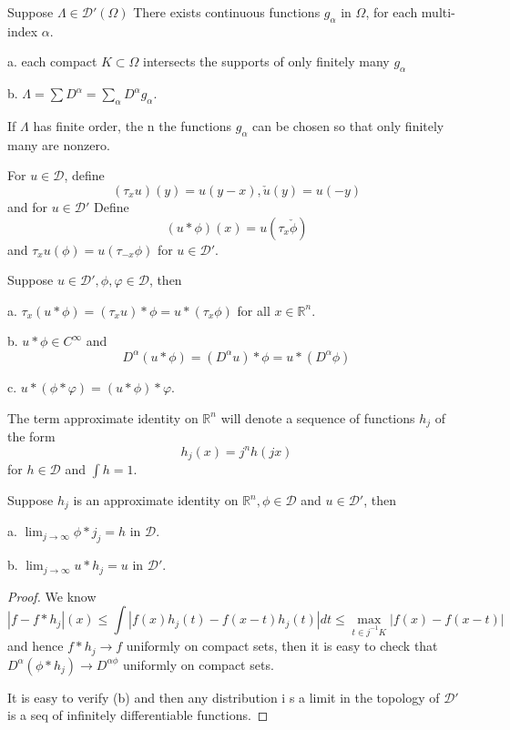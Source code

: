 \documentclass[lang=en, color=blue, ]{elegantbook}
\newcommand{\R}{\mathbb{R}}
\newcommand{\D}{\mathscr{D}}
\begin{document}
\begin{theorem}
    Suppose $\Lambda \in \D'(\Omega)$ There exists continuous functions $g_{\alpha}$ in $\Omega$, for each multi-index $\alpha$.\par
    a. each compact $K\subset \Omega$ intersects the supports of only finitely many $g_{\alpha}$\par
    b. $\Lambda = \sum D^{\alpha} = \sum_{\alpha} D^{\alpha}g_{\alpha}$.\par
    If $\Lambda$ has finite order, the n the functions $g_{\alpha}$ can be chosen so that only finitely many are nonzero.
\end{theorem}

\begin{definition}
    For $u\in \D$, define
    \[
    (\tau_x u)(y) = u(y-x), \check{u}(y) = u(-y) 
    \]
    and for $u \in \D'$ Define
    \[
    (u*\phi)(x) = u(\tau_x\check{\phi})
    \]
    and $\tau_x u(\phi) = u(\tau_{-x}\phi)$ for $u\in\D'$.
\end{definition}

\begin{theorem}
    Suppose $u\in\D',\phi,\varphi\in\D$, then\par
    a. $\tau_x(u*\phi) = (\tau_xu)*\phi = u*(\tau_x\phi)$ for all $x\in \R^n$.\par
    b. $u*\phi \in C^{\infty}$ and
    \[D^{\alpha}(u*\phi) = (D^{\alpha} u)*\phi = u*(D^{\alpha} \phi)\]\par
    c. $u*(\phi*\varphi) = (u*\phi)*\varphi$.
\end{theorem}

\begin{definition}
    The term approximate identity on $\R^n$ will denote a sequence of functions $h_j$ of the form
    \[h_j(x) = j^nh(jx)\]
    for $h\in \D$ and $\int h = 1$.
\end{definition}

\begin{theorem}
    Suppose $h_j$ is an approximate identity on $\R^n, \phi \in \D$ and $u\in \D'$, then\par
    a. $\lim_{j\to\infty} \phi*j_j = h$ in $\D$.\par
    b. $\lim_{j\to\infty} u*h_j = u$ in $\D'$.
\end{theorem}
\begin{proof}
    We know
    \[
    |f-f*h_j|(x) \leq \int |f(x)h_j(t)-f(x-t)h_j(t)|dt \leq \max_{t\in j^{-1}K}|f(x) - f(x-t)| 
    \]
    and hence $f*h_j \to f$ uniformly on compact sets, then it is easy to check that $D^{\alpha}(\phi*h_j) \to D^{\alpha \phi}$ uniformly on compact sets.\par
    It is easy to verify (b) and then any distribution i s a limit in the topology of $\D'$ is a seq of infinitely differentiable functions.
\end{proof}
\end{document}

